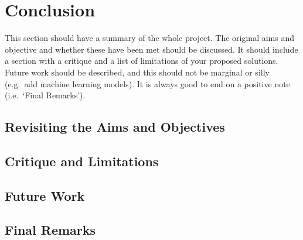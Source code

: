 \chapter{Conclusion}

This section should have a summary of the whole project.  The original aims and objective and whether these have been met should be discussed. It should include a section with a critique and a list of limitations of your proposed solutions.  Future work should be described, and this should not be marginal or silly (e.g.\ add machine learning models).  It is always good to end on a positive note (i.e.\ `Final Remarks').

\section{Revisiting the Aims and Objectives}
\blindtext

\section{Critique and Limitations}
\blindtext

\section{Future Work}
\blindtext

\section{Final Remarks}
\blindtext
